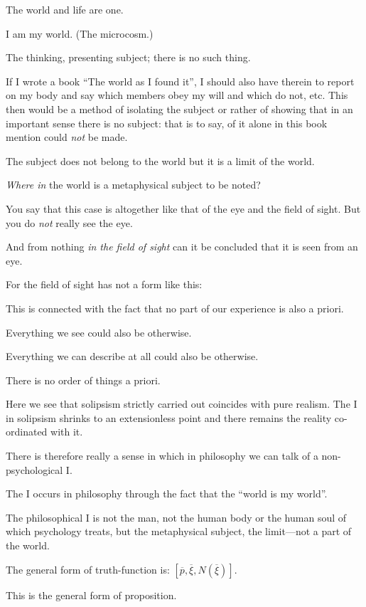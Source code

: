 {The world and life are one.}


{I am my world. (The microcosm.)}


{The thinking, presenting subject; there is no
such thing.

If I wrote a book ``The world as I found it'',
I should also have therein to report on my body
and say which members obey my will and which
do not, etc. This then would be a method of
isolating the subject or rather of showing that in
an important sense there is no subject: that is to
say, of it alone in this book mention could \emph{not} be
made.}


{The subject does not belong to the world but
it is a limit of the world.}


{\emph{Where in} the world is a metaphysical subject to
be noted?

You say that this case is altogether like that of
the eye and the field of sight. But you do \emph{not}
really see the eye.

And from nothing \emph{in the field of sight} can it be
concluded that it is seen from an eye.}


{For the field of sight has not a form like this:
}


{This is connected with the fact that no part of
our experience is also a priori.

Everything we see could also be otherwise.

Everything we can describe at all could also be
otherwise.

There is no order of things a priori.}


{Here we see that solipsism strictly carried out
coincides with pure realism. The I in solipsism
shrinks to an extensionless point and there remains
the reality co-ordinated with it.}


{There is therefore really a sense in which in
philosophy we can talk of a non-psy\-cho\-log\-i\-cal I.

The I occurs in philosophy through the fact
that the ``world is my world''.

The philosophical I is not the man, not the
human body or the human soul of which psychology
treats, but the metaphysical subject, the
limit---not a part of the world.}


{The general form of truth-function is:
$[\overline{p}, \overline{\xi}, N(\overline{\xi})]$.

This is the general form of proposition.}


